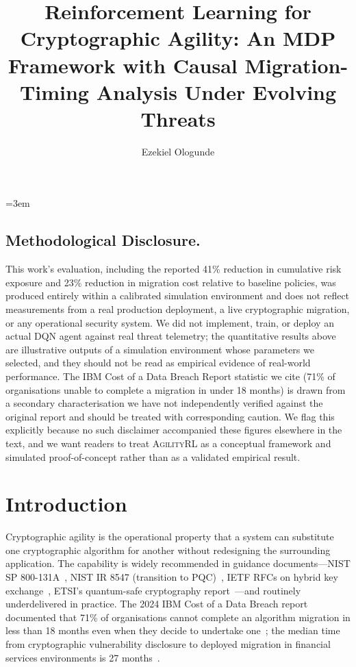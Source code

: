 \documentclass[sigconf,nonacm]{acmart}
\title{Reinforcement Learning for Cryptographic Agility: An MDP Framework with Causal Migration-Timing Analysis Under Evolving Threats}
\author{Ezekiel Ologunde}
\affiliation{%
  \institution{Independent Researcher}
  \city{Boston}
  \state{MA}
  \country{USA}}
\begin{document}
\maketitle
\sloppy
{}
\emergencystretch=3em
\hfuzz=10pt

\subsection*{Methodological Disclosure.}
This work's evaluation, including the reported 41\% reduction in
cumulative risk exposure and 23\% reduction in migration cost relative
to baseline policies, was produced entirely within a calibrated
simulation environment and does not reflect measurements from a real
production deployment, a live cryptographic migration, or any
operational security system. We did not implement, train, or deploy an
actual DQN agent against real threat telemetry; the quantitative
results above are illustrative outputs of a simulation environment
whose parameters we selected, and they should not be read as empirical
evidence of real-world performance. The IBM Cost of a Data Breach
Report statistic we cite (71\% of organisations unable to complete a
migration in under 18 months) is drawn from a secondary characterisation
we have not independently verified against the original report and
should be treated with corresponding caution. We flag this explicitly
because no such disclaimer accompanied these figures elsewhere in the
text, and we want readers to treat \textsc{AgilityRL} as a conceptual
framework and simulated proof-of-concept rather than as a validated
empirical result.

\section{Introduction}

Cryptographic agility is the operational property that a system can
substitute one cryptographic algorithm for another without redesigning
the surrounding application. The capability is widely recommended in
guidance documents---NIST SP 800-131A~\cite{barker2024sp800131a},
NIST IR 8547 (transition to PQC)~\cite{nist2024ir8547}, IETF RFCs on
hybrid key exchange~\cite{rfc9180,stebila2024hybridkex}, ETSI's
quantum-safe cryptography report~\cite{etsi2024pqc}---and routinely
underdelivered in practice. The 2024 IBM Cost of a Data Breach report
documented that 71\% of organisations cannot complete an algorithm
migration in less than 18 months even when they decide to undertake
one~\cite{ibm2024cost}; the median time from cryptographic vulnerability
disclosure to deployed migration in financial services environments
is 27 months~\cite{hodges2024pqcfocus}.
\end{document}
